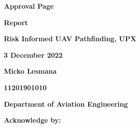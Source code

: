\documentclass[12pt]{report}
\begin{document}
        \begin{center}
            \textbf{\Large Approval Page}
            \vspace{0.4cm}

            \textbf{\Large Report}
            \vspace{0.4cm}
            
            \textbf{\Large Risk Informed UAV Pathfinding, UPX}
            \vspace{0.4cm}

            \textbf{\large 3 December 2022}
            \vspace{1cm}
            
                
            \textbf{\large Micko Lesmana}
            \vspace{0.3cm}

            \textbf{\large 11201901010}
            \vspace{0.3cm}
                
            \textbf{\large Department of Aviation Engineering}
            \vspace{2cm}

            \textbf{\large Acknowledge by:}
            \vspace{3cm}

        
    \end{center}
    \tableofcontents
    \listoffigures
    \listoftables
   
    \newpage
\end{document}
